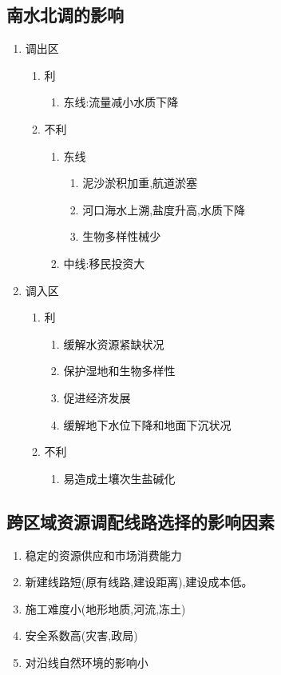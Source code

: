 \documentclass[a4paper]{article}
\begin{document}
    \subsection{南水北调的影响}
    \begin{enumerate}
        \item 调出区
        \begin{enumerate}
            \item 利
            \begin{enumerate}
                \item 东线:流量减小水质下降
            \end{enumerate}
            \item 不利
            \begin{enumerate}
                \item 东线
                \begin{enumerate}
                    \item 泥沙淤积加重,航道淤塞
                    \item 河口海水上溯,盐度升高,水质下降
                    \item 生物多样性械少
                \end{enumerate}
                \item 中线:移民投资大
            \end{enumerate}
        \end{enumerate}
        \item 调入区
        \begin{enumerate}
            \item 利
            \begin{enumerate}
                \item 缓解水资源紧缺状况
                \item 保护湿地和生物多样性
                \item 促进经济发展
                \item 缓解地下水位下降和地面下沉状况
            \end{enumerate}
            \item 不利
            \begin{enumerate}
                \item 易造成土壤次生盐碱化
            \end{enumerate}
        \end{enumerate}
    \end{enumerate}
    \subsection{跨区域资源调配线路选择的影响因素}
    \begin{enumerate}
        \item 稳定的资源供应和市场消费能力
        \item 新建线路短(原有线路,建设距离),建设成本低。
        \item 施工难度小(地形地质,河流,冻土)
        \item 安全系数高(灾害,政局)
        \item 对沿线自然环境的影响小
    \end{enumerate}
\end{document}
